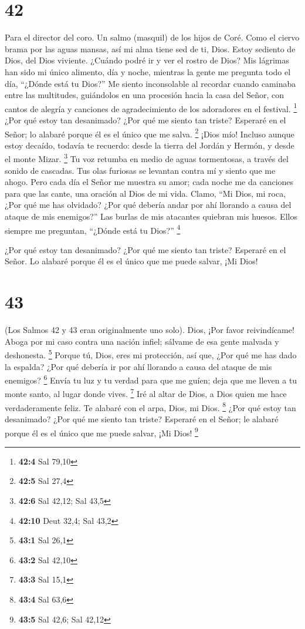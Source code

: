 \hypertarget{section-41}{%
\section{42}\label{section-41}}

Para el director del coro. Un salmo (masquil) de los hijos de Coré.
 Como el ciervo brama por las aguas mansas, así mi alma
tiene sed de ti, Dios.  Estoy sediento de Dios, del Dios
viviente. ¿Cuándo podré ir y ver el rostro de Dios?  Mis
lágrimas han sido mi único alimento, día y noche, mientras la gente me
pregunta todo el día, ``¿Dónde está tu Dios?''  Me siento
inconsolable al recordar cuando caminaba entre las multitudes,
guiándolos en una procesión hacia la casa del Señor, con cantos de
alegría y canciones de agradecimiento de los adoradores en el festival.
\footnote{\textbf{42:4} Sal 79,10}  ¿Por qué estoy tan
desanimado? ¿Por qué me siento tan triste? Esperaré en el Señor; lo
alabaré porque él es el único que me salva. \footnote{\textbf{42:5} Sal
  27,4}  ¡Dios mío! Incluso aunque estoy decaído, todavía te
recuerdo: desde la tierra del Jordán y Hermón, y desde el monte Mizar.
\footnote{\textbf{42:6} Sal 42,12; Sal 43,5}  Tu voz retumba
en medio de aguas tormentosas, a través del sonido de cascadas. Tus olas
furiosas se levantan contra mí y siento que me ahogo.  Pero
cada día el Señor me muestra su amor; cada noche me da canciones para
que las cante, una oración al Dios de mi vida.  Clamo, ``Mi
Dios, mi roca, ¿Por qué me has olvidado? ¿Por qué debería andar por ahí
llorando a causa del ataque de mis enemigos?''  Las burlas
de mis atacantes quiebran mis huesos. Ellos siempre me preguntan,
``¿Dónde está tu Dios?'' \footnote{\textbf{42:10} Deut 32,4; Sal 43,2}

 ¿Por qué estoy tan desanimado? ¿Por qué me siento tan
triste? Esperaré en el Señor. Lo alabaré porque él es el único que me
puede salvar, ¡Mi Dios!

\hypertarget{section-42}{%
\section{43}\label{section-42}}

(Los Salmos 42 y 43 eran originalmente uno solo).  Dios,
¡Por favor reivindícame! Aboga por mi caso contra una nación infiel;
sálvame de esa gente malvada y deshonesta. \footnote{\textbf{43:1} Sal
  26,1}  Porque tú, Dios, eres mi protección, así que, ¿Por
qué me has dado la espalda? ¿Por qué debería ir por ahí llorando a causa
del ataque de mis enemigos? \footnote{\textbf{43:2} Sal 42,10}
 Envía tu luz y tu verdad para que me guíen; deja que me
lleven a tu monte santo, al lugar donde vives. \footnote{\textbf{43:3}
  Sal 15,1}  Iré al altar de Dios, a Dios quien me hace
verdaderamente feliz. Te alabaré con el arpa, Dios, mi Dios. \footnote{\textbf{43:4}
  Sal 63,6}  ¿Por qué estoy tan desanimado? ¿Por qué me
siento tan triste? Esperaré en el Señor; le alabaré porque él es el
único que me puede salvar, ¡Mi Dios! \footnote{\textbf{43:5} Sal 42,6;
  Sal 42,12}

